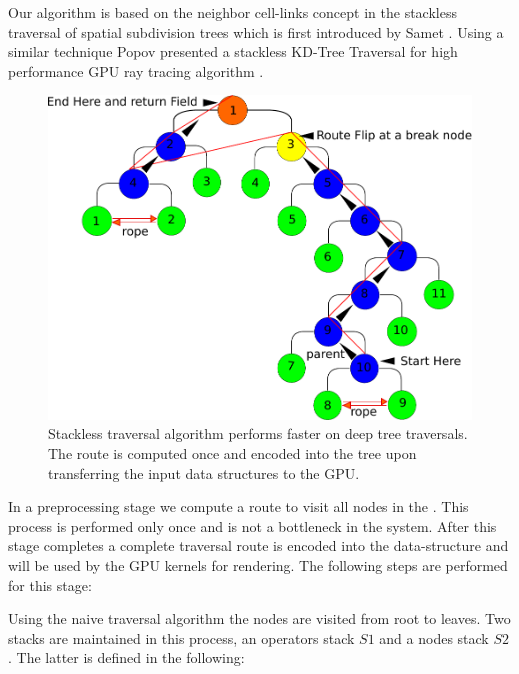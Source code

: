 Our algorithm is based on the neighbor cell-links concept in the stackless traversal of spatial subdivision trees which is first introduced by Samet \etal 
\cite{Samet1984,Samet1990}. Using a similar technique Popov \etal presented a stackless KD-Tree Traversal for high performance GPU ray tracing algorithm \cite{Popov2007}.

\begin{figure}[H]
  \centering
  \includegraphics[width=1.0\linewidth]{figures/gpupoly/stackless.pdf}
  \caption{\label{fig:stackless}
  {Stackless \blob traversal algorithm performs faster on deep tree traversals. The route is computed once and encoded into the tree upon transferring the input 
  data structures to the GPU.}
}
\end{figure}

In a preprocessing stage we compute a route to visit all nodes in the \blob. 
This process is performed only once and is not a bottleneck in the system.
After this stage completes a complete \blob traversal route is encoded into the data-structure and will be used by the GPU kernels for rendering.
The following steps are performed for this stage: 

Using the naive \blob traversal algorithm the nodes are visited from root to leaves. Two stacks are maintained in this process, an
operators stack $S1$ and a  nodes stack $S2$. The latter is defined in the following:

